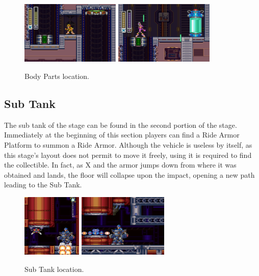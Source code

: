 \begin{figure}[htp]
	\centering
	\includegraphics[height=3cm]{figures/X3/Volt_catfish/Armor_1.png}
	\includegraphics[height=3cm]{figures/X3/Volt_catfish/Armor_2.png}
	\caption{Body Parts location.}
\end{figure}

\subsection{Sub Tank}
The sub tank of the stage can be found in the second portion of the stage. Immediately at the beginning of this section players can find a Ride Armor Platform to summon a Ride Armor. Although the vehicle is useless by itself, as this stage's layout does not permit to move it freely, using it is required to find the collectible. In fact, as X and the armor jumps down from where it was obtained and lands, the floor will collapse upon the impact, opening a new path leading to the Sub Tank.
\begin{figure}[htp]
	\centering
	\includegraphics[height=3cm]{figures/X3/Volt_catfish/tank_1.jpg}
	\includegraphics[height=3cm]{figures/X3/Volt_catfish/tank_2.jpg}
	\caption{Sub Tank location.}
\end{figure}

